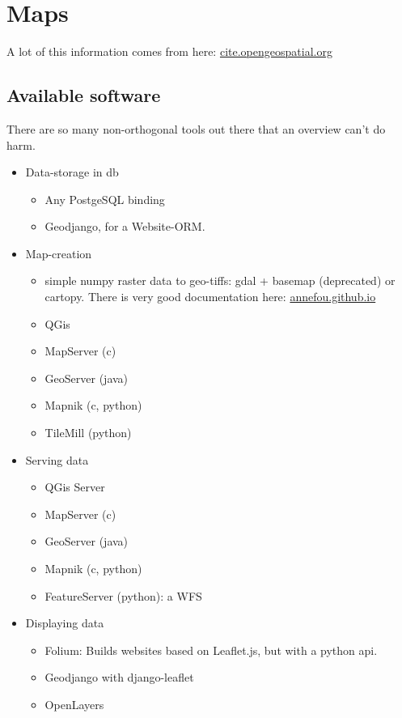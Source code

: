 \section{Maps}

A lot of this information comes from here: \href{http://cite.opengeospatial.org/pub/cite/files/edu/wmts/text/operations.html}{cite.opengeospatial.org}

\subsection{Available software} 

There are so many non-orthogonal tools out there that an overview can't do harm.

\begin{itemize}
    \item Data-storage in db
        \begin{itemize}
            \item Any PostgeSQL binding
            \item Geodjango, for a Website-ORM.
        \end{itemize}
    \item Map-creation
        \begin{itemize}
            \item simple numpy raster data to geo-tiffs: gdal + basemap (deprecated) or cartopy. There is very good documentation here: \href{https://annefou.github.io/metos\_python/04-plotting/}{annefou.github.io}
            \item QGis
            \item MapServer (c)
            \item GeoServer (java)
            \item Mapnik (c, python)
            \item TileMill (python)
        \end{itemize}
    \item Serving data
        \begin{itemize}
	    \item QGis Server
            \item MapServer (c)
            \item GeoServer (java)
            \item Mapnik (c, python)
            \item FeatureServer (python): a WFS 
        \end{itemize}
    \item Displaying data
        \begin{itemize}
            \item Folium: Builds websites based on Leaflet.js, but with a python api.
            \item Geodjango with django-leaflet
            \item OpenLayers
        \end{itemize}
\end{itemize}





